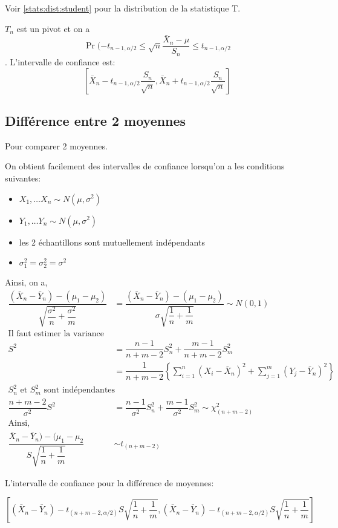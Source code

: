 Voir \autoref{stats:dist:student} pour la distribution de la statistique T.

$T_n$ est un pivot et on a 
\[\Pr(-t_{n-1,\alpha/2} \leq \sqrt{n}\dfrac{\bar{X}_n- \mu}{S_n} \leq t_{n-1,\alpha/2}\].
L'intervalle de confiance est:
\[\left [ \bar{X}_n - t_{n-1,\alpha/2} \dfrac{S_n}{\sqrt{n}},\bar{X}_n + t_{n-1,\alpha/2} \dfrac{S_n}{\sqrt{n}}\right ] \]

\subsection*{Différence entre 2 moyennes}

Pour comparer 2 moyennes.

On obtient facilement des intervalles de confiance lorsqu'on a les conditions suivantes:

\begin{itemize}
\item $X_1, \dots X_n \sim N(\mu, \sigma^2)$
\item $Y_1, \dots Y_n \sim N(\mu, \sigma^2)$
\item les 2 échantillons sont mutuellement indépendants
\item $\sigma^2_1=\sigma^2_2 =\sigma^2$
\end{itemize}

Ainsi, on a,
\begin{align*}
\dfrac{(\bar{X}_n-\bar{Y}_n)-(\mu_1-\mu_2)}{\sqrt{\dfrac{\sigma^2}{n}+ \dfrac{\sigma^2}{m}}}& =\dfrac{(\bar{X}_n-\bar{Y}_n)-(\mu_1-\mu_2)}{\sigma \sqrt{\dfrac{1}{n}+\dfrac{1}{m}}}\sim N(0,1)\\
\text{Il faut estimer la variance commune}\\
S^2& = \dfrac{n-1}{n+m-2}S^2_n+\dfrac{m-1}{n+m-2}S^2_m\\
& = \dfrac{1}{n+m-2} \left \{ \sum^n_{i=1} (X_i-\bar{X}_n)^2 + \sum^m_{j=1} (Y_j- \bar{Y}_n)^2 \right \} \\
S^2_n \text{ et } S^2_m \text{ sont indépendantes}\\
\dfrac{n+m-2}{\sigma^2}S^2& =\dfrac{n-1}{\sigma^2}S^2_n+ \dfrac{m-1}{\sigma^2} S_m^2 \sim \chi^2_{(n+m-2)}\\
\text{Ainsi,}\\
\dfrac{\bar{X}_n-\bar{Y}_n)-(\mu_1-\mu_2}{S \sqrt{\dfrac{1}{n} + \dfrac{1}{m}}} &\sim t_{(n+m-2)}
\end{align*}

L'intervalle de confiance pour la différence de moyennes:
 
\[ \left [ (\bar{X}_n - \bar{Y}_n) -t_{(n+m-2,\alpha/2)} S \sqrt{\dfrac{1}{n} +\dfrac{1}{m}},(\bar{X}_n - \bar{Y}_n) -t_{(n+m-2,\alpha/2)} S \sqrt{\dfrac{1}{n} +\dfrac{1}{m}} \right ]  \]

